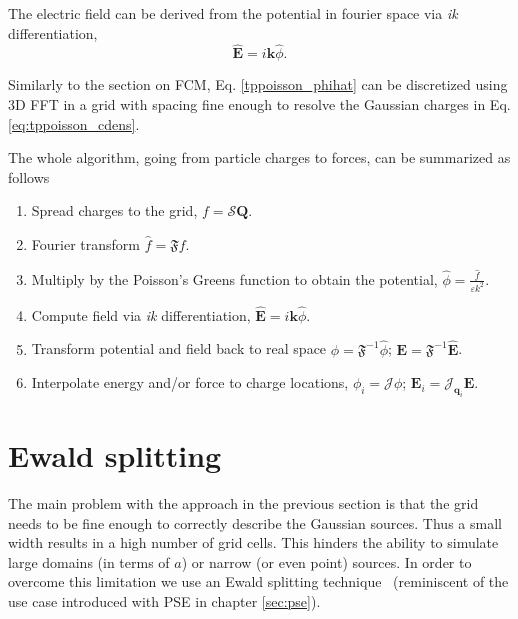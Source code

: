 \documentclass[ twoside,openright,titlepage,numbers=noenddot,%
headinclude,footinclude,cleardoublepage=empty,abstract=on,
BCOR=5mm,paper=b5,fontsize=11pt, dvipsnames
]{scrreprt}
\renewcommand{\vec}[1]{\bm{#1}}
\newcommand{\oper}[1]{\mathcal{#1}}
\newcommand{\fou}[1]{\widehat{#1}}
\newcommand{\ppos}{q}
\begin{document}
The electric field can be derived from the potential in fourier space via \emph{ik} differentiation,
\begin{equation}
    \label{tppoisson_ehat}
  \hat{\vec{E}} = i\vec{k}\hat{\phi}.
\end{equation}

Similarly to the section on \gls{FCM}, Eq. \eqref{tppoisson_phihat} can be discretized using 3D \gls{FFT} in a grid with spacing fine enough to resolve the Gaussian charges in Eq. \eqref{eq:tppoisson_cdens}.

The whole algorithm, going from particle charges to forces, can be summarized as follows
\begin{enumerate}
\item Spread charges to the grid, $f=\oper{S}\vec{Q}$.
\item Fourier transform $\hat{f} = \mathfrak{F}f$.
\item Multiply by the Poisson's Greens function to obtain the potential, $\fou{\phi} = \frac{\hat{f}}{\varepsilon k^2}$.
\item Compute field via \emph{ik} differentiation, $\fou{\vec{E}} = i\vec{k}\fou\phi$.
\item Transform potential and field back to real space $\phi = \mathfrak{F}^{-1}\fou\phi$; $\vec{E} = \mathfrak{F}^{-1}\fou{\vec{E}}$.
\item Interpolate energy and/or force to charge locations, $\phi_i = \oper{J}\phi$; $\vec{E}_i = \oper{J}_{\vec{\ppos}_i}\vec{E}$.
\end{enumerate}
\section{Ewald splitting}\label{sec:tppoisson_ewald}
The main problem with the approach in the previous section is that the grid needs to be fine enough to correctly describe the Gaussian sources. Thus a small width results in a high number of grid cells. This hinders the ability to simulate large domains (in terms of $a$) or narrow (or even point) sources. In order to overcome this limitation we use an Ewald splitting technique~\cite{Tornberg2015} (reminiscent of the use case introduced with \gls{PSE} in chapter \ref{sec:pse}).
\end{document}
